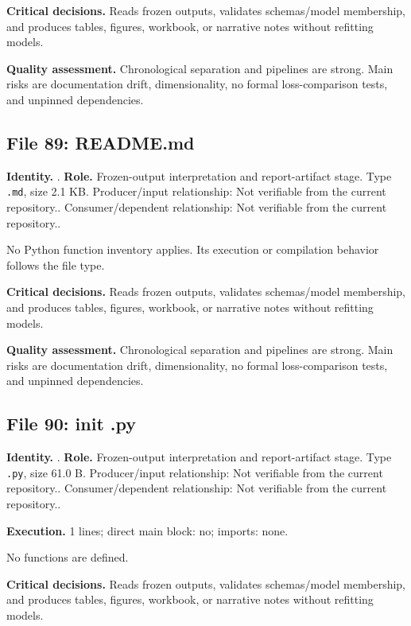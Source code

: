 \documentclass[
  11pt,
  a4paper]{article}
\newcounter{none} %
\begin{document}
\textbf{Critical decisions.} Reads frozen outputs, validates
schemas/model membership, and produces tables, figures, workbook, or
narrative notes without refitting models.

\textbf{Quality assessment.} Chronological separation and pipelines are
strong. Main risks are documentation drift, dimensionality, no formal
loss-comparison tests, and unpinned dependencies.

\subsection{File 89: README.md}\label{file-874325580978413026}

\textbf{Identity.} .
\textbf{Role.} Frozen-output interpretation and report-artifact stage.
Type \texttt{.md}, size 2.1 KB. Producer/input relationship: Not
verifiable from the current repository.. Consumer/dependent
relationship: Not verifiable from the current repository..

No Python function inventory applies. Its execution or compilation
behavior follows the file type.

\textbf{Critical decisions.} Reads frozen outputs, validates
schemas/model membership, and produces tables, figures, workbook, or
narrative notes without refitting models.

\textbf{Quality assessment.} Chronological separation and pipelines are
strong. Main risks are documentation drift, dimensionality, no formal
loss-comparison tests, and unpinned dependencies.

\subsection{File 90: init .py}\label{file-2812744270656302489}

\textbf{Identity.} .
\textbf{Role.} Frozen-output interpretation and report-artifact stage.
Type \texttt{.py}, size 61.0 B. Producer/input relationship: Not
verifiable from the current repository.. Consumer/dependent
relationship: Not verifiable from the current repository..

\textbf{Execution.} 1 lines; direct main block: no; imports: none.

No functions are defined.

\textbf{Critical decisions.} Reads frozen outputs, validates
schemas/model membership, and produces tables, figures, workbook, or
narrative notes without refitting models.
\end{document}
